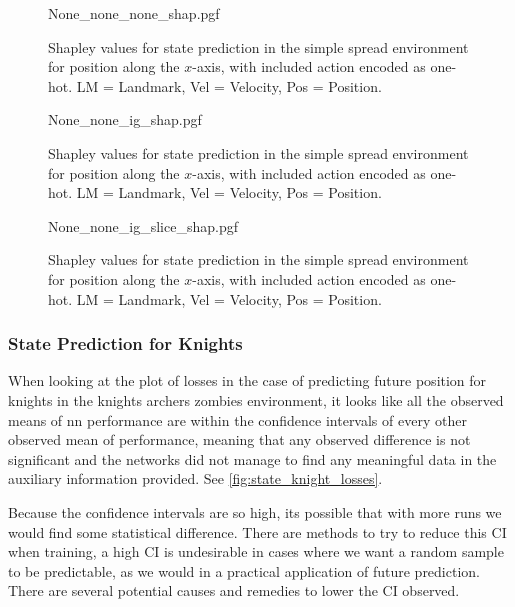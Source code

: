 \documentclass[UKenglish]{uiomasterthesis}
\begin{document}
\begin{figure}[hbtp]
\centering
{None_none_none_shap.pgf}
\caption{Shapley values for state prediction in the simple spread environment for position along the $x$-axis, with included action encoded as one-hot. LM = Landmark, Vel = Velocity, Pos = Position.}
\label{fig:event_kaz_knight}
\end{figure}

\begin{figure}[hbtp]
\centering
{None_none_ig_shap.pgf}
\caption{Shapley values for state prediction in the simple spread environment for position along the $x$-axis, with included action encoded as one-hot. LM = Landmark, Vel = Velocity, Pos = Position.}
\label{fig:event_kaz_knight_ig}
\end{figure}

\begin{figure}[hbtp]
\centering
{None_none_ig_slice_shap.pgf}
\caption{Shapley values for state prediction in the simple spread environment for position along the $x$-axis, with included action encoded as one-hot. LM = Landmark, Vel = Velocity, Pos = Position.}
\label{fig:event_kaz_knight_ig_slice}
\end{figure}


\subsubsection{State Prediction for Knights}
When looking at the plot of losses in the case of predicting future position for knights in the knights archers zombies environment, it looks like all the observed means of \ac{nn} performance are within the confidence intervals of every other observed mean of performance, meaning that any observed difference is not significant and the networks did not manage to find any meaningful data in the auxiliary information provided. See \cref{fig:state_knight_losses}.

Because the confidence intervals are so high, its possible that with more runs we would find some statistical difference. There are methods to try to reduce this CI when training, a high CI is undesirable in cases where we want a random sample to be predictable, as we would in a practical application of future prediction. There are several potential causes and remedies to lower the CI observed. 
\end{document}
